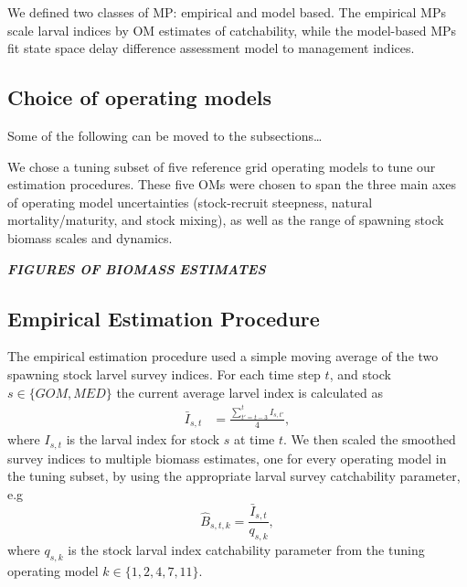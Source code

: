 \documentclass[]{article}
\begin{document}
We defined two classes of MP: empirical and model based. The empirical MPs
scale larval indices by OM estimates of catchability, while the
model-based MPs fit state space delay difference assessment model
to management indices.

\hypertarget{choice-of-operating-models}{%
\subsection{Choice of operating models}\label{choice-of-operating-models}}

Some of the following can be moved to the subsections\ldots{}

We chose a tuning subset of five reference grid operating models to tune our
estimation procedures. These five OMs were chosen to span the three main axes
of operating model uncertainties (stock-recruit steepness, natural
mortality/maturity, and stock mixing), as well as the range of spawning
stock biomass scales and dynamics.

\textbf{\emph{FIGURES OF BIOMASS ESTIMATES}}

\hypertarget{empirical-estimation-procedure}{%
\subsection{Empirical Estimation Procedure}\label{empirical-estimation-procedure}}

The empirical estimation procedure used a simple moving average of
the two spawning stock larvel survey indices. For each time step \(t\),
and stock \(s \in \{GOM, MED\}\) the current average larvel index is
calculated as
\begin{align}
\bar{I}_{s,t} & = \frac{\sum_{t'= t-3}^{t} I_{s,t'}}{4}, 
\end{align}
where \(I_{s,t}\) is the larval index for stock \(s\) at time \(t\). We then
scaled the smoothed survey indices to multiple biomass estimates, one
for every operating model in the tuning subset, by using the appropriate
larval survey catchability parameter, e.g
\begin{equation}
\hat{B}_{s,t,k} = \frac{\bar{I}_{s,t}}{q_{s,k}},
\end{equation}
where \(q_{s,k}\) is the stock larval index catchability parameter from
the tuning operating model \(k \in \{1,2,4,7,11\}\).
\end{document}
